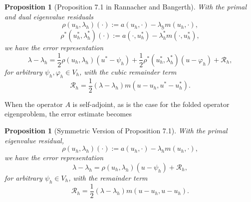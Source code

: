 \documentclass[12pt,a4paper]{article}
\theoremstyle{boldthm}
\newtheorem{proposition}[theorem]{Proposition}
\theoremstyle{bolddefn}
\begin{document}
\begin{proposition}[Proposition 7.1 in Rannacher and Bangerth]
With the primal and dual eigenvalue residuals
\begin{equation}
\rho(u_h,\lambda_h)(\cdot)
:= a(u_h,\cdot) - \lambda_h m(u_h,\cdot),
\end{equation} 
\begin{equation}
\rho^*(u_h^*,\lambda_h^*)(\cdot)
:= a(\cdot,u_h^*) - \overline{\lambda_h^*} m(\cdot,u_h^*),
\end{equation}
we have the error representation
\begin{equation}\label{err}
\lambda - \lambda_h
=
\frac{1}{2}\rho(u_h,\lambda_h)(u^*-\psi_h)
+
\frac{1}{2}\rho^*(u_h^*,\lambda_h^*)(u-\varphi_h)
+
\mathcal{R}_h,
\end{equation}
for arbitrary $\psi_h,\varphi_h\in V_h$, with the cubic remainder term
\begin{equation}
\mathcal{R}_h
=
\frac{1}{2}(\lambda-\lambda_h)
m(u-u_h,u^*-u_h^*).
\end{equation}
\end{proposition}

When the operator $A$ is self-adjoint, as is the case for the folded operator eigenproblem, the error estimate becomes

\begin{proposition}[Symmetric Version of Proposition 7.1]
With the primal eigenvalue residual,
\begin{equation}
\rho(u_h,\lambda_h)(\cdot)
:= a(u_h,\cdot) - \lambda_h m(u_h,\cdot),
\end{equation} 
we have the error representation
\begin{equation}\label{err}
\lambda - \lambda_h
=
\rho(u_h,\lambda_h)(u-\psi_h)
+
\mathcal{R}_h,
\end{equation}
for arbitrary $\psi_h\in V_h$, with the remainder term
\begin{equation}
\mathcal{R}_h
=
\frac{1}{2}(\lambda-\lambda_h)
m(u-u_h,u-u_h).
\end{equation}
\end{proposition}
\end{document}
